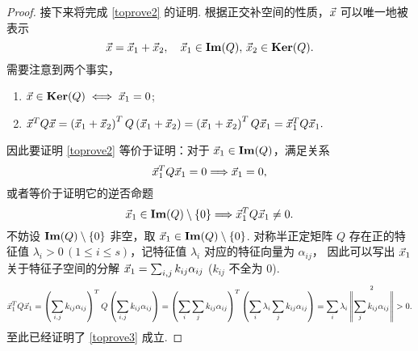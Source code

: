 \begin{proof}
    \nextproofphase
    接下来将完成 \eqref{toprove2} 的证明.
    根据正交补空间的性质，$\vec{x}$ 可以唯一地被表示
    \begin{equation*}
        \vec{x} = \vec{x}_1 + \vec{x}_2,\quad \vec{x}_1\in\mathbf{Im}(Q),\, \vec{x}_2\in\mathbf{Ker}(Q).
    \end{equation*}
    需要注意到两个事实，
    \begin{enumerate}[nosep]
        \item $\vec{x}\in\mathbf{Ker}(Q) \iff \vec{x}_1 = 0$;
        \item $\vec{x}^T Q \vec{x} = \left( \vec{x}_1 + \vec{x}_2 \right)^T Q \left( \vec{x}_1 + \vec{x}_2 \right) = \left( \vec{x}_1 + \vec{x}_2 \right)^T Q \vec{x}_1 = \vec{x}_1^T Q \vec{x}_1.$
    \end{enumerate}
    因此要证明 \eqref{toprove2} 等价于证明：对于 $\vec{x}_1\in\mathbf{Im}(Q)$，满足关系
    \begin{equation*}
        \vec{x}_1^T Q \vec{x}_1 = 0 \Longrightarrow \vec{x}_1 = 0,
    \end{equation*}
    或者等价于证明它的逆否命题
    \begin{equation}\label{toprove3}
        \vec{x}_1 \in \mathbf{Im}(Q)\setminus \{0\} \Longrightarrow \vec{x}_1^T Q \vec{x}_1 \neq 0.
    \end{equation}
    不妨设 $\mathbf{Im}(Q)\setminus \{0\}$ 非空，取 $\vec{x}_1 \in \mathbf{Im}(Q)\setminus \{0\}$. 对称半正定矩阵 $Q$ 存在正的特征值 $\lambda_i > 0\, (1\leq i\leq s)$，记特征值 $\lambda_i$ 对应的特征向量为 $\alpha_{ij}$，
    因此可以写出 $\vec{x}_1$ 关于特征子空间的分解 $\vec{x}_1 = \sum_{i,j} k_{ij}\alpha_{ij}$ ($k_{ij}$ 不全为 0).
    \begin{equation*}
        \vec{x}_1^T Q \vec{x}_1 = \left( \sum_{i,j} k_{ij}\alpha_{ij} \right)^T Q \left( \sum_{i,j} k_{ij}\alpha_{ij} \right) 
        = \left( \sum_{i} \sum_{j} k_{ij}\alpha_{ij} \right)^T \left( \sum_{i} \lambda_i \sum_{j} k_{ij}\alpha_{ij} \right)
        = \sum_i \lambda_i \mathop{\left\| \sum_{j} k_{ij}\alpha_{ij} \right\|}^2
        > 0.
    \end{equation*}
    至此已经证明了 \eqref{toprove3} 成立. 
\end{proof}